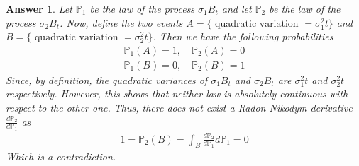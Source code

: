 \documentclass[12pt]{article}
\theoremstyle{colon}
\newtheorem*{answer}{Answer}
\begin{document}
\begin{answer}
  Let $\mathbb{P}_1$ be the law of the process $\sigma_1 B_t$ and let $\mathbb{P}_2$ be the law of the process $\sigma_2 B_t$. Now, define the two events $A = \{ \text{ quadratic variation } = \sigma_1^2 t \}$ and $B = \{ \text{ quadratic variation } = \sigma_2^2 t \}$. Then we have the following probabilities
  \begin{gather*}
    \mathbb{P}_1(A) = 1, \quad \mathbb{P}_2(A) = 0 \\
    \mathbb{P}_1(B) = 0, \quad \mathbb{P}_2(B) = 1
  \end{gather*}
  Since, by definition, the quadratic variances of $\sigma_1 B_t$ and $\sigma_2 B_t$ are $\sigma_1^2 t$ and $\sigma_2^2 t$ respectively. However, this shows that neither law is absolutely continuous with respect to the other one. Thus, there does not exist a Radon-Nikodym derivative $\frac{d \mathbb{P}_2}{d \mathbb{P}_1}$ as
  \begin{gather*}
    1 = \mathbb{P}_2(B) = \int_B \frac{d \mathbb{P}_2}{d \mathbb{P}_1} d \mathbb{P}_1 = 0
  \end{gather*}
  Which is a contradiction.
\end{answer}
\end{document}
